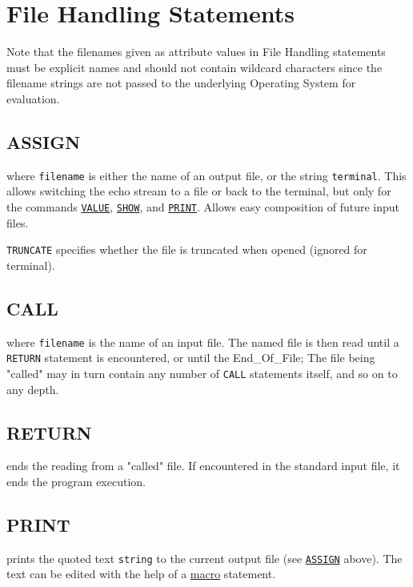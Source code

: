 \chapter{File Handling Statements}
\label{chap:files}

Note that the filenames given as attribute values in File Handling statements 
must be explicit names and should not contain wildcard characters since the 
filename strings are not passed to the underlying Operating System for evaluation.


\section{ASSIGN}
\label{sec:assign}

where \texttt{filename} is either the name of an output file, or the
string \texttt{terminal}.
This allows switching the echo stream to a file or back to the terminal,
but only for the commands \hyperref[sec:value]{\texttt{VALUE}}, 
\hyperref[sec:show]{\texttt{SHOW}}, and \hyperref[sec:print]{\texttt{PRINT}}. 
Allows easy composition of future \madx input files.

\texttt{TRUNCATE} specifies whether the file is truncated when opened 
(ignored for terminal). 


\section{CALL}
\label{sec:call}
where \texttt{filename} is the name of an input file. The named file is
then read until a \texttt{RETURN} statement is encountered, or until the
End\_Of\_File; The file being "called" may in turn contain any number of
\texttt{CALL} statements itself, and so on to any depth.

\section{RETURN}
\label{Sec:return}
ends the reading from a "called" file. If encountered in the standard
input file, it ends the program execution.  


\section{PRINT}
\label{sec:print}
prints the quoted text \texttt{string} to the current output file (see
\hyperref[sec:assign]{\texttt{ASSIGN}} above). The text can be edited
with the help of a \hyperref[sec:macro]{macro} statement.


